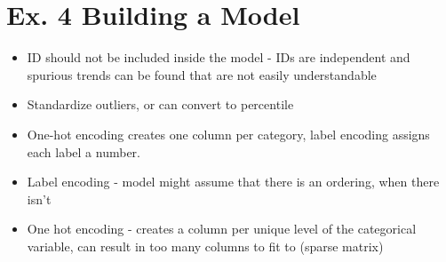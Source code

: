 \documentclass{article}
\begin{document}
\section{Ex. 4 Building a Model}
\begin{itemize}
    \item ID should not be included inside the model - IDs are independent and spurious trends can be found that are not easily understandable
    \item Standardize outliers, or can convert to percentile
    \item One-hot encoding creates one column per category, label encoding assigns each label a number.
        \item Label encoding - model might assume that there is an ordering, when there isn't
        \item One hot encoding - creates a column per unique level of the categorical variable, can result in too many columns to fit to (sparse matrix)
\end{itemize}
\end{document}
